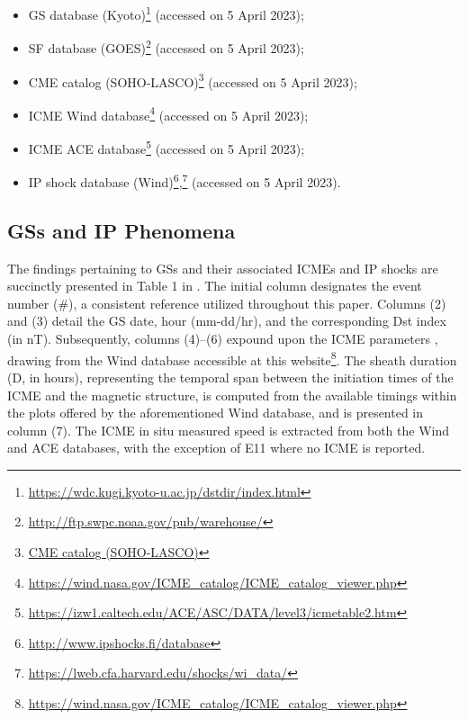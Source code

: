 \begin{itemize}
	\item GS database (Kyoto)\footnote{\url{https://wdc.kugi.kyoto-u.ac.jp/dstdir/index.html}} (accessed on 5 April 2023);
	\item SF database (GOES)\footnote{\url{http://ftp.swpc.noaa.gov/pub/warehouse/}} (accessed on 5 April 2023);
	\item CME catalog (SOHO-LASCO)\footnote{\url{CME catalog (SOHO-LASCO)}} (accessed on 5 April 2023);
	\item ICME Wind database\footnote{\url{https://wind.nasa.gov/ICME_catalog/ICME_catalog_viewer.php}} (accessed on 5 April 2023);
	\item ICME ACE database\footnote{\url{https://izw1.caltech.edu/ACE/ASC/DATA/level3/icmetable2.htm}} (accessed on 5 April 2023);
	\item IP shock database (Wind)\footnote{\url{http://www.ipshocks.fi/database}},\footnote{\url{https://lweb.cfa.harvard.edu/shocks/wi_data/}} (accessed on 5 April 2023).
\end{itemize}

\subsection{GSs and IP Phenomena}
The findings pertaining to GSs and their associated ICMEs and IP shocks are succinctly presented in Table 1 in \citet{miteva_2023}. The initial column designates the event number (\#), a consistent reference utilized throughout this paper. Columns (2) and (3) detail the GS date, hour (mm-dd/hr), and the corresponding Dst index (in nT). Subsequently, columns (4)–(6) expound upon the ICME parameters \citep{nieves_2018}, drawing from the Wind database accessible at this website\footnote{\url{https://wind.nasa.gov/ICME_catalog/ICME_catalog_viewer.php}}. The sheath duration (D, in hours), representing the temporal span between the initiation times of the ICME and the magnetic structure, is computed from the available timings within the plots offered by the aforementioned Wind database, and is presented in column (7). The ICME in situ measured speed is extracted from both the Wind and ACE databases, with the exception of E11 where no ICME is reported.

